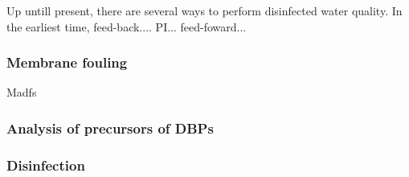 Up untill present, there are several ways to perform disinfected water quality. In the earliest time, feed-back.... PI... feed-foward...


\subsubsection{Membrane fouling}
Madfs
\subsubsection{Analysis of precursors of DBPs}

\subsubsection{Disinfection}
